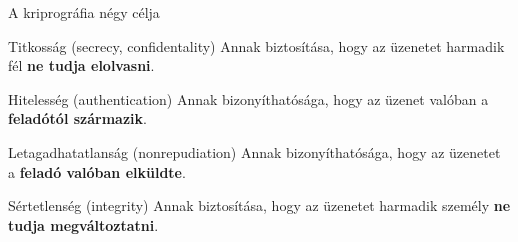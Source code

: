 \documentclass[12 pt]{beamer}
\newcommand{\tanedo}{tanedolight}		%
\newcommand{\Comment}[1]{\textcolor{Comment}{\footnotesize{#1}\normalsize}} %
\begin{document}
{\begin{frame}[c]
\begin{center}
    \end{center}
  \end{frame}
  }


\begin{frame}{A kriprográfia négy célja}

  \begin{block}{Titkosság (secrecy, confidentality)}
    Annak biztosítása, hogy az üzenetet harmadik fél \textbf{ne tudja elolvasni}.
  \end{block}

  \begin{block}{Hitelesség (authentication)}
    Annak bizonyíthatósága, hogy az üzenet valóban a \textbf{feladótól származik}.
  \end{block}

  \begin{block}{Letagadhatatlanság (nonrepudiation)}
    Annak bizonyíthatósága, hogy az üzenetet a \textbf{feladó valóban elküldte}.
  \end{block}

  \begin{block}{Sértetlenség (integrity)}
    Annak biztosítása, hogy az üzenetet harmadik személy \textbf{ne tudja megváltoztatni}.
  \end{block}
  
\end{frame}

\end{document}
